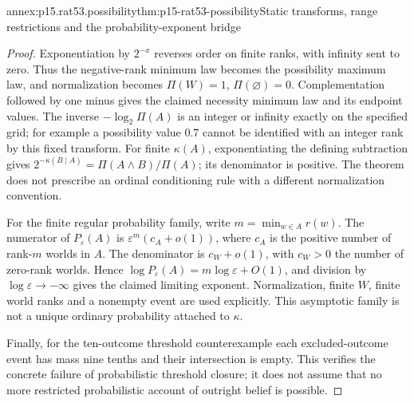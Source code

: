 \begin{annexitem}{annex:p15.rat53.possibility}{thm:p15-rat53-possibility}{Static transforms, range restrictions and the probability-exponent bridge}
\begin{proof}
Exponentiation by \(2^{-x}\) reverses order on finite ranks, with infinity
sent to zero.  Thus the negative-rank minimum law becomes the possibility
maximum law, and normalization becomes \(\Pi(W)=1\),
\(\Pi(\varnothing)=0\).  Complementation followed by one minus gives
the claimed necessity minimum law and its endpoint values.
The inverse \(-\log_2\Pi(A)\) is an integer or infinity exactly on the
specified grid; for example a possibility value \(0.7\) cannot be
identified with an integer rank by this fixed transform.
For finite \(\kappa(A)\), exponentiating the defining subtraction gives
\(2^{-\kappa(B\mid A)}=\Pi(A\land B)/\Pi(A)\); its denominator
is positive.  The theorem does not prescribe an ordinal conditioning rule
with a different normalization convention.

For the finite regular probability family, write \(m=\min_{w\in A}r(w)\).
The numerator of \(P_\varepsilon(A)\) is
\(\varepsilon^m(c_A+o(1))\), where \(c_A\) is the positive number
of rank-\(m\) worlds in \(A\).  The denominator is
\(c_W+o(1)\), with \(c_W>0\) the number of zero-rank worlds.
Hence
\(\log P_\varepsilon(A)=m\log\varepsilon+O(1)\), and division by
\(\log\varepsilon\to-\infty\) gives the claimed limiting exponent.
Normalization, finite \(W\), finite world ranks and a nonempty event are
used explicitly.  This asymptotic family is not a unique ordinary
probability attached to \(\kappa\).

Finally, for the ten-outcome threshold counterexample each excluded-outcome
event has mass nine tenths and their intersection is empty.  This verifies
the concrete failure of probabilistic threshold closure; it does not assume
that no more restricted probabilistic account of outright belief is possible.
\end{proof}
\end{annexitem}

